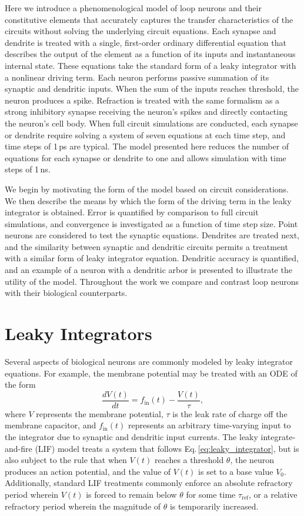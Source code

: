 \documentclass[twocolumn]{article}
\begin{document}
Here we introduce a phenomenological model of loop neurons and their constitutive elements that accurately captures the transfer characteristics of the circuits without solving the underlying circuit equations. Each synapse and dendrite is treated with a single, first-order ordinary differential equation that describes the output of the element as a function of its inputs and instantaneous internal state. These equations take the standard form of a leaky integrator with a nonlinear driving term. Each neuron performs passive summation of its synaptic and dendritic inputs. When the sum of the inputs reaches threshold, the neuron produces a spike. Refraction is treated with the same formalism as a strong inhibitory synapse receiving the neuron's spikes and directly contacting the neuron's cell body. When full circuit simulations are conducted, each synapse or dendrite require solving a system of seven equations at each time step, and time steps of 1\,ps are typical. The model presented here reduces the number of equations for each synapse or dendrite to one and allows simulation with time steps of 1\,ns. 

We begin by motivating the form of the model based on circuit considerations. We then describe the means by which the form of the driving term in the leaky integrator is obtained. Error is quantified by comparison to full circuit simulations, and convergence is investigated as a function of time step size. Point neurons are considered to test the synaptic equations. Dendrites are treated next, and the similarity between synaptic and dendritic circuits permits a treatment with a similar form of leaky integrator equation. Dendritic accuracy is quantified, and an example of a neuron with a dendritic arbor is presented to illustrate the utility of the model. Throughout the work we compare and contrast loop neurons with their biological counterparts. 

\section{\label{sec:leaky_integrators}Leaky Integrators}
Several aspects of biological neurons are commonly modeled by leaky integrator equations. For example, the membrane potential may be treated with an ODE of the form
\begin{equation}
\label{eq:leaky_integrator}
\frac{dV(t)}{dt} = f_{\mathrm{in}}(t)-\frac{V(t)}{\tau},
\end{equation}
where $V$ represents the membrane potential, $\tau$ is the leak rate of charge off the membrane capacitor, and $f_{\mathrm{in}}(t)$ represents an arbitrary time-varying input to the integrator due to synaptic and dendritic input currents. The leaky integrate-and-fire (LIF) model treats a system that follows Eq.\,\ref{eq:leaky_integrator}, but is also subject to the rule that when $V(t)$ reaches a threshold $\theta$, the neuron produces an action potential, and the value of $V(t)$ is set to a base value $V_0$. Additionally, standard LIF treatments commonly enforce an absolute refractory period wherein $V(t)$ is forced to remain below $\theta$ for some time $\tau_{\mathrm{ref}}$, or a relative refractory period wherein the magnitude of $\theta$ is temporarily increased.
\end{document}
